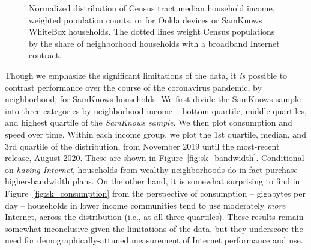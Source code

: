\documentclass[11 pt]{amsart}
\begin{document}
\begin{figure}[]
\centering
{}
\caption{Normalized distribution of Census tract median household income, weighted population counts, or for Ookla devices or SamKnows WhiteBox households.  The dotted lines weight Census populations by the share of neighborhood households with a broadband Internet contract. \label{fig:rep_mhi}}
\end{figure}


Though we emphasize the significant limitations of the data,
it \emph{is} possible to contrast performance over the course of the
coronavirus pandemic, by neighborhood,
for SamKnows households.
We first divide the SamKnows sample into three categories
by neighborhood income -- bottom quartile, middle quartiles, and highest quartile of the \emph{SamKnows sample}.
We then plot consumption and speed over time.
Within each income group,
we plot the 1st quartile, median, and 3rd quartile
of the distribution, from November 2019 until the most-recent release, August 2020.
These are shown in Figure~\ref{fig:sk_bandwidth}.
Conditional on \emph{having Internet},
households from wealthy neighborhoods do in fact purchase higher-bandwidth plans.
On the other hand, it is somewhat surprising to find in Figure~\ref{fig:sk_consumption}
from the perspective of consumption -- gigabytes per day --
households in lower income communities tend to use moderately \emph{more}
Internet, across the distribution (i.e., at all three quartiles).
These results remain somewhat inconclusive given the limitations of the data,
but they underscore the need for demographically-attuned
measurement of Internet performance and use.
\end{document}
